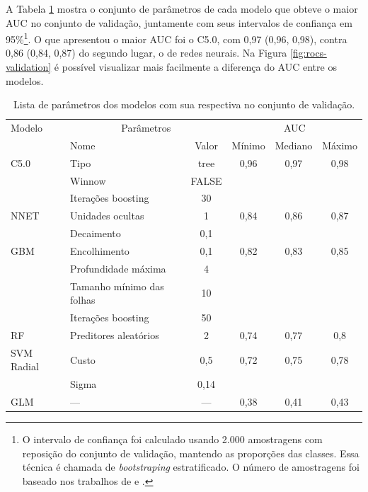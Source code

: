 \documentclass[a4paper,titlepage]{ppgi}\usepackage[]{graphicx}\usepackage[]{color}
\begin{document}
A Tabela \ref{table:resultados-validacao} mostra o conjunto de parâmetros de
cada modelo que obteve o maior \gls{AUC} no conjunto de validação, juntamente com seus
intervalos de confiança em 95\%\footnote{O intervalo de confiança foi
calculado usando 2.000 amostragens com reposição do conjunto de validação,
mantendo as proporções das classes. Essa técnica é chamada de
\emph{bootstraping} estratificado. O número de amostragens foi baseado nos
trabalhos de  e .}. O que
apresentou o maior \gls{AUC} foi o C5.0, com 0,97
(0,96, 0,98),
contra 0,86
(0,84, 0,87)
do segundo lugar, o de redes neurais. Na Figura \ref{fig:rocs-validation} é
possível visualizar mais facilmente a diferença do \gls{AUC} entre os modelos.

\begin{table}
\caption{Lista de parâmetros dos modelos com sua respectiva 
no conjunto de validação.}
\label{table:resultados-validacao}
\centering
\begin{tabular}{l l c c c c}
  Modelo & \multicolumn{2}{c}{Parâmetros} & \multicolumn{3}{c}{AUC} \\ \cline{2-6}
  & \multicolumn{1}{|l}{Nome} & \multicolumn{1}{c|}{Valor} & Mínimo & Mediano & \multicolumn{1}{c|}{Máximo} \\
  \hline
  C5.0 & Tipo & tree & 0,96&0,97&0,98 \\
       & Winnow & FALSE & & & \\
       & Iterações boosting & 30 & & & \\
  NNET & Unidades ocultas & 1 & 0,84&0,86&0,87 \\
       & Decaimento & 0,1 & & & \\
  GBM & Encolhimento & 0,1 & 0,82&0,83&0,85 \\
      & Profundidade máxima & 4 & & & \\
      & Tamanho mínimo das folhas & 10 & & & \\
      & Iterações boosting & 50 & & & \\
  RF & Preditores aleatórios & 2 & 0,74&0,77&0,8 \\
  SVM Radial & Custo & 0,5 & 0,72&0,75&0,78 \\
             & Sigma & 0,14 & & & \\
  GLM & --- & --- & 0,38&0,41&0,43 \\
\end{tabular}
\end{table}
\end{document}

